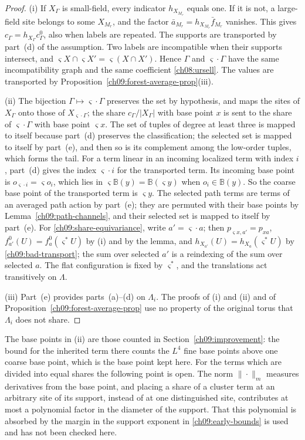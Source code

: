 \begin{proof}
(i) If $X_\Gamma$ is small-field, every indicator $h_{X_{M_r}}$ equals
one. If it is not, a large-field site belongs to some $X_{M_r}$, and
the factor $\bar a_{M_r}=h_{X_{M_r}}\bar f_{M_r}$ vanishes. This gives
$c_\Gamma=h_{X_\Gamma}c^0_\Gamma$, also when labels are repeated. The
supports are transported by part~(d) of the assumption. Two labels are
incompatible when their supports intersect, and
$\varsigma X\cap\varsigma X'=\varsigma(X\cap X')$. Hence $\Gamma$ and
$\varsigma\cdot\Gamma$ have the same incompatibility graph and the
same coefficient \eqref{ch08:ursell}. The values are transported by
Proposition~\ref{ch09:forest-average-prop}(iii).

(ii) The bijection $\Gamma\mapsto\varsigma\cdot\Gamma$ preserves the
set by hypothesis, and maps the sites of $X_\Gamma$ onto those of
$X_{\varsigma\cdot\Gamma}$; the share $c_\Gamma/|X_\Gamma|$ with base point
$x$ is sent to the share of $\varsigma\cdot\Gamma$ with base point
$\varsigma x$. The set of tuples of degree at least three is mapped to
itself because part~(d) preserves the classification; the selected set
is mapped to itself by part~(e), and then so is its complement among
the low-order tuples, which forms the tail. For a term linear in an
incoming localized term with index $i$, part~(d) gives the index
$\varsigma\cdot i$ for the transported term. Its incoming base point is
$o_{\varsigma\cdot i}=\varsigma o_i$, which lies in
$\varsigma\mathbb B(y)=\mathbb B(\varsigma y)$ when $o_i\in\mathbb B(y)$.
So the coarse base point of the transported term is $\varsigma y$. The
selected path terms are terms of an averaged path action by
part~(e); they are permuted with their base points by
Lemma~\ref{ch09:path-channels}, and their selected set is mapped to
itself by part~(e). For \eqref{ch09:share-equivariance}, write
$a'=\varsigma\cdot a$; then $p_{\varsigma x,a'}=p_{xa}$,
$f^0_{a'}(U)=f^0_a(\varsigma^*U)$ by (i) and by the lemma, and
$h_{X_{a'}}(U)=h_{X_a}(\varsigma^*U)$ by \eqref{ch09:bad-transport};
the sum over selected $a'$ is a reindexing of the sum over selected
$a$. The flat configuration is fixed by $\varsigma^*$, and the
translations act transitively on $\Lambda$.

(iii) Part~(e) provides parts~(a)--(d) on $\Lambda_i$. The proofs of
(i) and (ii) and of Proposition~\ref{ch09:forest-average-prop} use no
property of the original torus that $\Lambda_i$ does not share.
\end{proof}

The base points in (ii) are those counted in
Section~\ref{ch09:improvement}: the bound for the inherited term there
counts the $L^4$ fine base points above one coarse base point, which is the
base point kept here. For the terms which are divided into equal shares
the following point is open. The norm $\|\cdot\|_m$ measures
derivatives from the base point, and placing a share of a cluster term at
an arbitrary site of its support, instead of at one distinguished
site, contributes at most a polynomial factor in the diameter of the support. That
this polynomial is absorbed by the margin in the support exponent in
\eqref{ch09:early-bounds} is used and has not been checked here.

